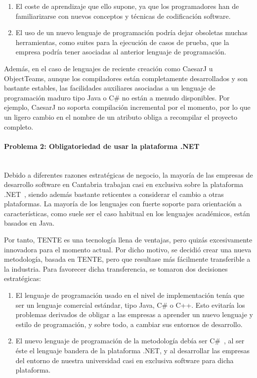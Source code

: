 \begin{enumerate}
\item El coste de aprendizaje que ello supone, ya que los programadores han de familiarizarse con nuevos conceptos y técnicas de codificación software.
\item El uso de un nuevo lenguaje de programación podría dejar obsoletas muchas herramientas, como suites para la ejecución de casos de prueba, que la empresa podría tener asociadas al anterior lenguaje de programación.
\end{enumerate}

Además, en el caso de lenguajes de reciente creación como CaesarJ u ObjectTeams, aunque los compiladores están completamente desarrollados y son bastante estables, las facilidades auxiliares asociadas a un lenguaje de programación maduro tipo Java o C\# no están a menudo disponibles. Por ejemplo, CaesarJ no soporta compilación incremental por el momento, por lo que un ligero cambio en el nombre de un atributo obliga a recompilar el proyecto completo.

\paragraph{Problema 2: Obligatoriedad de usar la plataforma .NET} \ \\

Debido a diferentes razones estratégicas de negocio, la mayoría de las empresas de desarrollo software en Cantabria trabajan casi en exclusiva sobre la plataforma .NET~\cite{chappell:2006}, siendo además bastante reticentes a considerar el cambio a otras plataformas. La mayoría de los lenguajes con fuerte soporte para orientación a características, como suele ser el caso habitual en los lenguajes académicos, están basados en Java.

Por tanto, TENTE es una tecnología llena de ventajas, pero quizás excesivamente innovadora para el momento actual. Por dicho motivo, se decidió crear una nueva metodología, basada en TENTE, pero que resultase más fácilmente transferible a la industria. Para favorecer dicha transferencia, se tomaron dos decisiones estratégicas:

\begin{enumerate}
	\item El lenguaje de programación usado en el nivel de implementación tenía que ser un lenguaje comercial estándar, tipo Java, C\# o C++. Esto evitaría los problemas derivados de obligar a las empresas a aprender un nuevo lenguaje y estilo de programación, y sobre todo, a cambiar sus entornos de desarrollo.
	\item El nuevo lenguaje de programación de la metodología debía ser C\#~\cite{fons:2008}, al ser éste el lenguaje bandera de la plataforma .NET, y al desarrollar las empresas del entorno de nuestra universidad casi en exclusiva software para dicha plataforma.
\end{enumerate}

